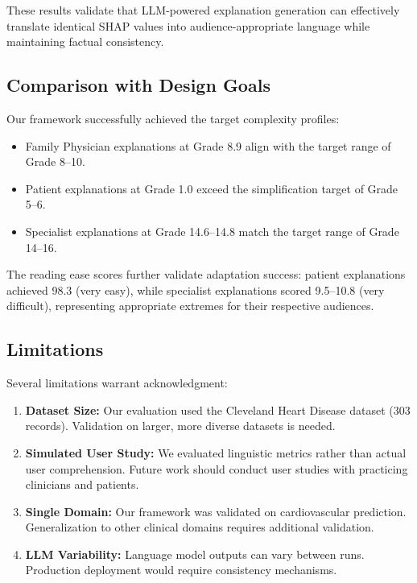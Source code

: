 \documentclass{ieeeaccess}
\begin{document}
These results validate that LLM-powered explanation generation can effectively translate identical SHAP values into audience-appropriate language while maintaining factual consistency.

\subsection{Comparison with Design Goals}

Our framework successfully achieved the target complexity profiles:

\begin{itemize}
\item Family Physician explanations at Grade 8.9 align with the target range of Grade 8--10.
\item Patient explanations at Grade 1.0 exceed the simplification target of Grade 5--6.
\item Specialist explanations at Grade 14.6--14.8 match the target range of Grade 14--16.
\end{itemize}

The reading ease scores further validate adaptation success: patient explanations achieved 98.3 (very easy), while specialist explanations scored 9.5--10.8 (very difficult), representing appropriate extremes for their respective audiences.

\subsection{Limitations}

Several limitations warrant acknowledgment:

\begin{enumerate}
\item \textbf{Dataset Size:} Our evaluation used the Cleveland Heart Disease dataset (303 records). Validation on larger, more diverse datasets is needed.

\item \textbf{Simulated User Study:} We evaluated linguistic metrics rather than actual user comprehension. Future work should conduct user studies with practicing clinicians and patients.

\item \textbf{Single Domain:} Our framework was validated on cardiovascular prediction. Generalization to other clinical domains requires additional validation.

\item \textbf{LLM Variability:} Language model outputs can vary between runs. Production deployment would require consistency mechanisms.
\end{enumerate}
\end{document}
